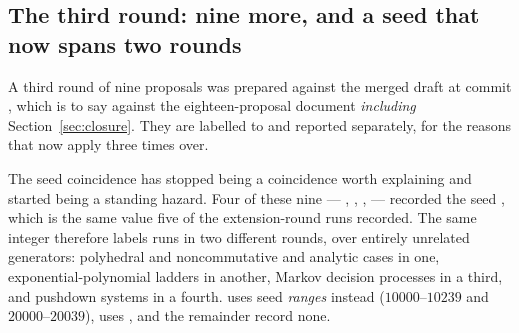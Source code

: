 \subsection{The third round: nine more, and a seed that now spans two rounds}
\label{sec:round-three-runs}

A third round of nine proposals was prepared against the merged draft at commit
, which is to say against the eighteen-proposal document
\emph{including} Section~\ref{sec:closure}. They are labelled  to
 and reported separately, for the reasons that now apply three times
over.

The seed coincidence has stopped being a coincidence worth explaining and
started being a standing hazard. Four of these nine --- , ,
,  --- recorded the seed , which is the same
value five of the extension-round runs recorded. The same integer therefore
labels runs in two different rounds, over entirely unrelated generators:
polyhedral and noncommutative and analytic cases in one, exponential-polynomial
ladders in another, Markov decision processes in a third, and pushdown systems
in a fourth.  uses seed \emph{ranges} instead
($10000$--$10239$ and $20000$--$20039$),  uses , and
the remainder record none.

